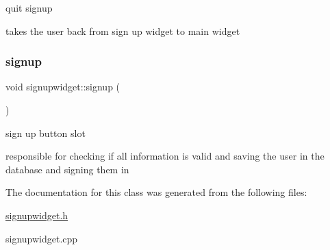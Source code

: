 quit signup 

takes the user back from sign up widget to main widget \mbox{\label{classsignupwidget_af3e836d1d5c48db21b8ae0bcaf1e8216}} 
\subsubsection{\texorpdfstring{signup}{signup}}
{\footnotesize\ttfamily void signupwidget\+::signup (\begin{DoxyParamCaption}{ }\end{DoxyParamCaption})\hspace{0.3cm}{\ttfamily [slot]}}



sign up button slot 

responsible for checking if all information is valid and saving the user in the database and signing them in 

The documentation for this class was generated from the following files\+:\begin{DoxyCompactItemize}
\item 
\hyperlink{signupwidget_8h}{signupwidget.\+h}\item 
signupwidget.\+cpp\end{DoxyCompactItemize}
